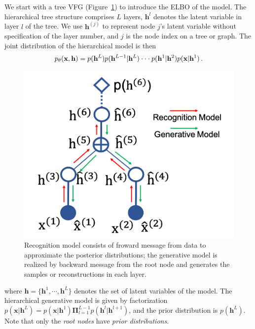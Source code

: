 \documentclass[sigconf, anonymous, review]{acmart}
\theoremstyle{plain}
\theoremstyle{definition}
\theoremstyle{remark}
\begin{document}
We start with a tree VFG (Figure~\ref{fig:tree_message}) to introduce the ELBO of the model. The hierarchical tree structure comprises $L$ layers, $\mathbf{h}^l$ denotes the latent variable in layer $l$ of the tree. We use  $\mathbf{h}^{(j)}$ to represent node $j$'s latent variable without specification of the layer number, and $j$ is the node index on a tree or graph.  
The joint distribution of the hierarchical model is then
\begin{align}\notag
p_{\theta}(\mathbf{x}, \mathbf{h}) = p( \mathbf{h}^{L}) p(\mathbf{h}^{L-1} | \mathbf{h}^{L}) \cdot \cdot  \cdot p(\mathbf{h}^{1} | \mathbf{h}^{2})  p(\mathbf{x} | \mathbf{h}^{1}) \, .
\end{align}
\begin{figure}
\vspace{-0.2in}
\begin{center}
 \includegraphics[width=1.0\linewidth]{fig/tree_message2.png}
\end{center}
\vspace{-0.15in}
\caption{Recognition model consists of froward message from  data to approximate the posterior distributions; the generative model is realized by backward message from the root node and generates the samples or reconstructions in each layer.}
\label{fig:tree_message}
\vspace{-0.15in}
\end{figure}
where $\mathbf{h}=\{\mathbf{h}^1, \cdots, \mathbf{h}^L \}$ denotes the set of latent variables of the model. The hierarchical generative model is given by factorization $p(\mathbf{x}|\mathbf{h}^L) = p(\mathbf{x} | \mathbf{h}^{1}) \mathbf{\Pi}_{l=1}^{L-1}p(\mathbf{h}^{l} | \mathbf{h}^{l+1})  $, and the prior distribution is $p(\mathbf{h}^L)$. Note that only the \emph{root nodes} have \emph{prior distributions}. 
\end{document}
